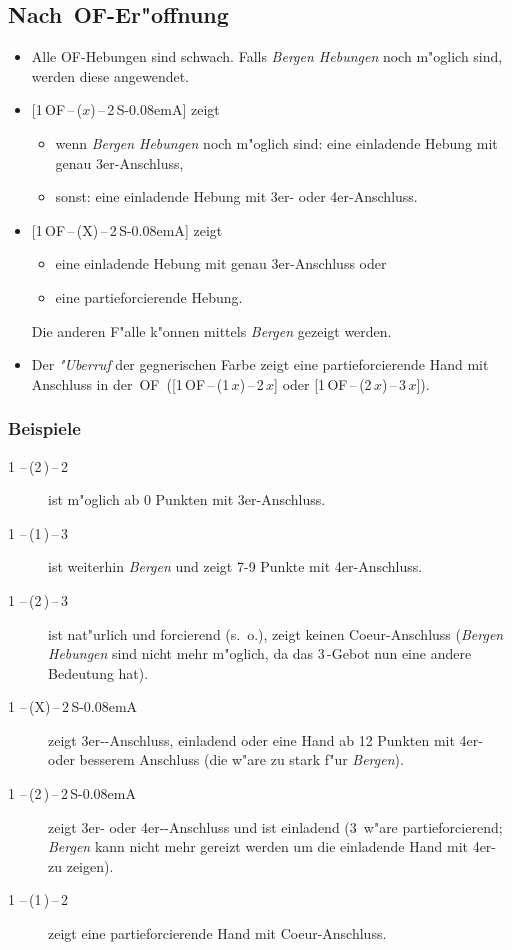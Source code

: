 \documentclass[11pt,german,twocolumn]{scrartcl}
\def\pik{\nobreak\,\Sp\xspace}
\def\coe{\nobreak\,\He\xspace}
\def\kar{\nobreak\,\Di\xspace}
\def\tre{\nobreak\,\Cl\xspace}
\def\pi{\Sp\xspace}
\def\of{\nobreak\textsf{\,OF}\xspace}
\def\ofa{\nobreak\textsf{OF}\xspace}
\def\sa{\nobreak\textsf{S\kern-0.08emA}\xspace}
\def\SA{\nobreak\,\sa}
\def\kontra{\textsf{X}\xspace}
\def\sep{\,--\,}
\newcommand{\conv}[1]{\emph{#1}}
\begin{document}
\subsection{Nach \of-Er"offnung}
\begin{itemize}
\item Alle \ofa-Hebungen sind schwach.  Falls \conv{Bergen Hebungen}
  noch m"oglich sind, werden diese angewendet.
\item {[}1\of{}\sep($x$){}\sep2\SA{]} zeigt
  \begin{itemize}
  \item wenn \conv{Bergen Hebungen} noch m"oglich sind: eine einladende
    Hebung mit genau 3er-Anschluss,
  \item sonst: eine einladende Hebung mit 3er- oder 4er-Anschluss.
  \end{itemize}
\item {[}1\of{}\sep(\kontra){}\sep2\SA{]} zeigt
  \begin{itemize}
    \item eine einladende Hebung mit genau 3er-Anschluss oder
    \item eine partieforcierende Hebung.
  \end{itemize}
Die anderen F"alle k"onnen mittels \conv{Bergen} gezeigt werden.
\item Der \conv{"Uberruf} der gegnerischen Farbe zeigt eine
  partieforcierende Hand mit Anschluss in der \of\
  ([1\of{}\sep(1\,$x$){}\sep2\,$x$] oder [1\of{}\sep(2\,$x$){}\sep3\,$x$]).
\end{itemize}

\subsubsection{Beispiele}
\begin{description}
\item[1\pik{}\sep(2\kar){}\sep2\pik] ist m"oglich ab 0 Punkten mit
  3er-Anschluss.
\item[1\coe{}\sep(1\pik){}\sep3\kar] ist weiterhin \conv{Bergen} und zeigt
  7-9 Punkte mit 4er-Anschluss.
\item[1\coe{}\sep(2\tre){}\sep3\kar] ist nat"urlich und forcierend
  (s.~o.), zeigt keinen Coeur-Anschluss (\conv{Bergen Hebungen} sind
  nicht mehr m"oglich, da das 3\tre-Gebot nun eine andere Bedeutung
  hat).
\item[1\pik{}\sep(X){}\sep2\SA] zeigt 3er-\pi-Anschluss, einladend oder
  eine Hand ab 12 Punkten mit 4er- oder besserem Anschluss (die w"are
  zu stark f"ur \conv{Bergen}).
\item[1\pik{}\sep(2\kar){}\sep2\SA] zeigt 3er- oder 4er-\pi-Anschluss und
  ist einladend (3\kar w"are partieforcierend; \conv{Bergen} kann
  nicht mehr gereizt werden um die einladende Hand mit 4er-\pi{}
  zu zeigen).
\item[1\coe{}\sep(1\pik){}\sep2\pik] zeigt eine partieforcierende Hand mit
  Coeur-Anschluss.
\end{description}
\end{document}
